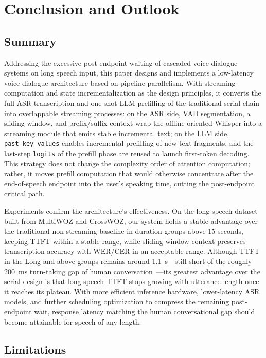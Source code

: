 \documentclass[a4paper,11pt]{article}
\begin{document}
\section{Conclusion and Outlook}

\subsection{Summary}

Addressing the excessive post-endpoint waiting of cascaded voice dialogue systems on long speech input, this paper designs and implements a low-latency voice dialogue architecture based on pipeline parallelism. With streaming computation and state incrementalization as the design principles, it converts the full ASR transcription and one-shot LLM prefilling of the traditional serial chain into overlappable streaming processes: on the ASR side, VAD segmentation, a sliding window, and prefix/suffix context wrap the offline-oriented Whisper into a streaming module that emits stable incremental text; on the LLM side, \texttt{past\_key\_values} enables incremental prefilling of new text fragments, and the last-step \texttt{logits} of the prefill phase are reused to launch first-token decoding. This strategy does not change the complexity order of attention computation; rather, it moves prefill computation that would otherwise concentrate after the end-of-speech endpoint into the user's speaking time, cutting the post-endpoint critical path.

Experiments confirm the architecture's effectiveness. On the long-speech dataset built from MultiWOZ and CrossWOZ, our system holds a stable advantage over the traditional non-streaming baseline in duration groups above 15 seconds, keeping TTFT within a stable range, while sliding-window context preserves transcription accuracy with WER/CER in an acceptable range. Although TTFT in the Long-and-above groups remains around 1.1~s---still short of the roughly 200~ms turn-taking gap of human conversation~\cite{ref21}---its greatest advantage over the serial design is that long-speech TTFT stops growing with utterance length once it reaches its plateau. With more efficient inference hardware, lower-latency ASR models, and further scheduling optimization to compress the remaining post-endpoint wait, response latency matching the human conversational gap should become attainable for speech of any length.

\subsection{Limitations}
\end{document}
